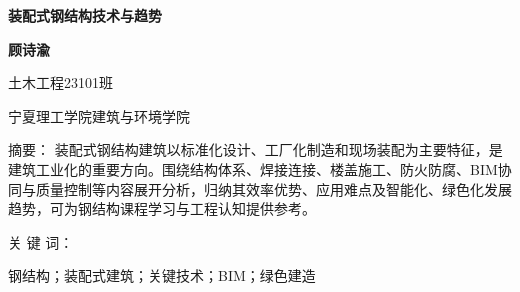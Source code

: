 ﻿\documentclass[UTF8,a4paper,10.5pt]{ctexart}
\newenvironment{abstracttext}{\fontsize{9pt}{14pt}\selectfont\songti}{}
\begin{document}
\begin{center}
  {\heiti\bfseries 装配式钢结构技术与趋势\par}
  \vspace{0.8em}
  {\kaishu\bfseries 顾诗渝\par}
  \vspace{0.4em}
  {\songti 土木工程23101班\par}
  \vspace{0.4em}
  {\songti 宁夏理工学院建筑与环境学院\par}
\end{center}

{\heiti 摘\quad 要：}
\begin{abstracttext}
装配式钢结构建筑以标准化设计、工厂化制造和现场装配为主要特征，是建筑工业化的重要方向。围绕结构体系、焊接连接、楼盖施工、防火防腐、BIM协同与质量控制等内容展开分析，归纳其效率优势、应用难点及智能化、绿色化发展趋势，可为钢结构课程学习与工程认知提供参考。
\par
\end{abstracttext}

\vspace{0.4em}
{\heiti 关 键 词：}
{\songti 钢结构；装配式建筑；关键技术；BIM；绿色建造\par}

\vspace{1\baselineskip}
\end{document}
